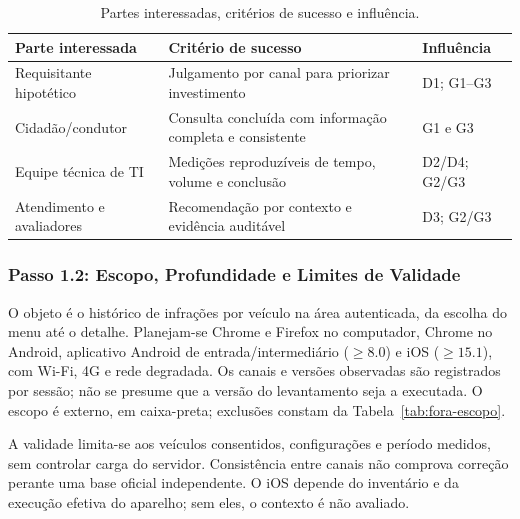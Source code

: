 \begin{table}[htbp]
\centering
\caption{Partes interessadas, critérios de sucesso e influência.}
\label{tab:partes-interessadas}
\footnotesize
\begin{tabular}{P{3.6cm}P{6.6cm}P{2.5cm}}
\toprule
Parte interessada & Critério de sucesso & Influência \\
\midrule
Requisitante hipotético & Julgamento por canal para priorizar investimento & D1; G1--G3 \\
Cidadão/condutor & Consulta concluída com informação completa e consistente & G1 e G3 \\
Equipe técnica de TI & Medições reproduzíveis de tempo, volume e conclusão & D2/D4; G2/G3 \\
Atendimento e avaliadores & Recomendação por contexto e evidência auditável & D3; G2/G3 \\
\bottomrule
\end{tabular}
\par{}
\end{table}

\subsubsection{Passo 1.2: Escopo, Profundidade e Limites de Validade}
\label{subsec:escopo}

O objeto é o histórico de infrações por veículo na área autenticada, da escolha do menu até o detalhe. Planejam-se Chrome e Firefox no computador, Chrome no Android, aplicativo Android de entrada/intermediário ($\ge 8.0$) e iOS ($\ge 15.1$), com Wi-Fi, 4G e rede degradada. Os canais e versões observadas são registrados por sessão; não se presume que a versão do levantamento seja a executada. O escopo é externo, em caixa-preta; exclusões constam da Tabela~\ref{tab:fora-escopo}.

A validade limita-se aos veículos consentidos, configurações e período medidos, sem controlar carga do servidor. Consistência entre canais não comprova correção perante uma base oficial independente. O iOS depende do inventário e da execução efetiva do aparelho; sem eles, o contexto é não avaliado.

